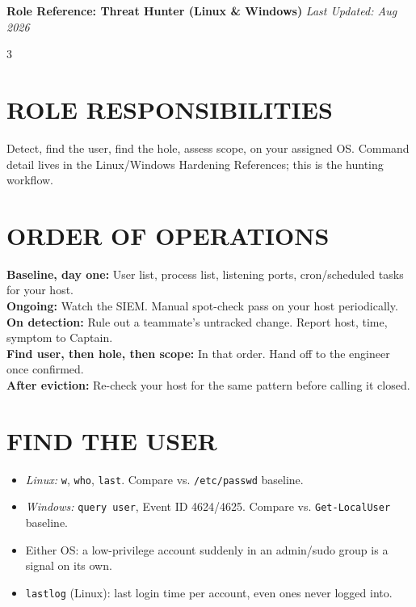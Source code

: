 \documentclass[7pt,landscape]{article}
\begin{document}
\textbf{Role Reference: Threat Hunter (\textcolor{linuxc}{Linux} \& \textcolor{winc}{Windows})} \hfill \textit{Last Updated: Aug 2026}
\raggedcolumns
\begin{multicols*}{3}

\section{ROLE RESPONSIBILITIES}
Detect, find the user, find the hole, assess scope, on your assigned OS. Command detail lives in the Linux/Windows Hardening References; this is the hunting workflow.

\section{ORDER OF OPERATIONS}
\textbf{Baseline, day one:} User list, process list, listening ports, cron/scheduled tasks for your host. \\
\textbf{Ongoing:} Watch the SIEM. Manual spot-check pass on your host periodically. \\
\textbf{On detection:} Rule out a teammate's untracked change. Report host, time, symptom to Captain. \\
\textbf{Find user, then hole, then scope:} In that order. Hand off to the engineer once confirmed. \\
\textbf{After eviction:} Re-check your host for the same pattern before calling it closed.

\section{FIND THE USER}
\begin{itemize}
    \item \textit{\textcolor{linuxc}{Linux:}} \texttt{w}, \texttt{who}, \texttt{last}. Compare vs. \texttt{/etc/passwd} baseline.
    \item \textit{\textcolor{winc}{Windows:}} \texttt{query user}, Event ID 4624/4625. Compare vs. \texttt{Get-LocalUser} baseline.
    \item Either OS: a low-privilege account suddenly in an admin/sudo group is a signal on its own.
    \item \texttt{lastlog} \textcolor{linuxc}{(Linux)}: last login time per account, even ones never logged into.
\end{itemize}


\end{multicols*}
\end{document}
